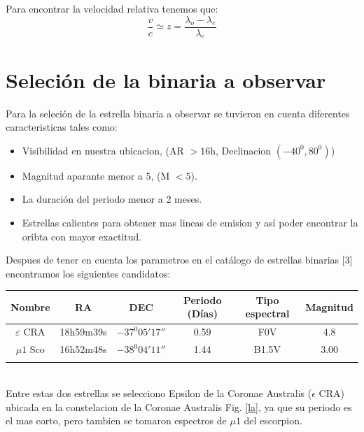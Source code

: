 \documentclass[Proceedings]{ascelike}
\begin{document}
Para encontrar la velocidad relativa tenemos que:
\begin{equation}
\dfrac{v}{c} \simeq z = \dfrac{\lambda_{o} - \lambda_{e}}{ \lambda_{e}}
\end{equation} 

\section{Seleci\'on de la binaria a observar}

Para la seleci\'on de la estrella binaria a observar se tuvieron en cuenta 
diferentes caracteristicas tales como:

\begin{itemize}
\item Visibilidad en nuestra ubicacion, (AR $> 16$h, Declinacion $(-40^{0}, 80^{0})$)
\item Magnitud aparante menor a 5, (M $<5$).
\item La duraci\'on del periodo menor a 2 meses.
\item Estrellas calientes para obtener mas lineas de emision y as\'i poder
encontrar la oribta con mayor exactitud.
\end{itemize}

Despues de tener en cuenta los parametros en el cat\'alogo de estrellas binarias [3] encontramos los siguientes candidatos:\\

\begin{tabular}{c c c c c c}
\hline
Nombre & RA & DEC & Periodo (D\'ias) & Tipo espectral & Magnitud\\
\hline
$\varepsilon$ $\mathrm{CRA}$ & 18h59m39s & $-37^{0}05' 17''$ & 0.59 & F0V & 4.8\\
\hline
$\mu 1$ $\mathrm{Sco}$ & 16h52m48s & $-38^{0}04'11''$& 1.44 & B1.5V& 3.00\\
\hline
\\
\end{tabular}
\\
Entre estas dos estrellas se selecciono Epsilon de la Coronae Australis (${\epsilon}$ CRA) ubicada en la 
constelacion de la Coronae Australis Fig. \ref{la}, ya que su periodo es el mas corto, pero tambien se tomaron 
espectros de $\mu 1$ del escorpion. 
\end{document}

